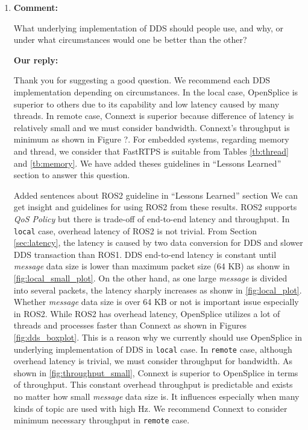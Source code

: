 \documentclass{article}
\begin{document}
\begin{enumerate}
\item \begin{flushleft}
  \textbf{Comment:}
\end{flushleft}
  What underlying implementation of DDS should people use, and why, or under what circumstances would one be better than the other? 

  \begin{flushleft}
    \textbf{Our reply:}
  \end{flushleft}
  Thank you for suggesting a good question.
  We recommend each DDS implementation depending on circumstances.
  In the local case, OpenSplice is superior to others due to its capability and low latency caused by many threads.
  In remote case, Connext is superior because difference of latency is relatively small and we must consider bandwidth.
  Connext's throughput is minimum as shown in Figure ?.
  For embedded systems, regarding memory and thread, we consider that FastRTPS is suitable from Tables \ref{tb:thread} and \ref{tb:memory}.
  We have added theses guidelines in ``Lessons Learned'' section to answer this question.
  \begin{itembox}[|]{Added sentences about ROS2 guideline in ``Lessons Learned'' section}
    We can get insight and guidelines for using ROS2 from these results.
    ROS2 supports \emph{QoS Policy} but there is trade-off of end-to-end latency and throughput.
    In \texttt{local} case, overhead latency of ROS2 is not trivial.
    From Section \ref{sec:latency}, the latency is caused by two data conversion for DDS and slower DDS transaction than ROS1.
    DDS end-to-end latency is constant until \emph{message} data size is lower than maximum packet size (64 KB) as shonw in \ref{fig:local_small_plot}.
    On the other hand, as one large \emph{message} is divided into several packets, the latency sharply increases as shonw in \ref{fig:local_plot}.
    Whether \emph{message} data size is over 64 KB or not is important issue especially in ROS2.
    While ROS2 has overhead latency, OpenSplice utilizes a lot of threads and processes faster than Connext as shown in Figures \ref{fig:dds_boxplot}.
    This is a reason why we currently should use OpenSplice in underlying implementation of DDS in \texttt{local} case.
    In \texttt{remote} case, although overhead latency is trivial, we must consider throughput for bandwidth.
    As shown in \ref{fig:throughput_small}, Connext is superior to OpenSplice in terms of throughput.
    This constant overhead throughput is predictable and exists no matter how small \emph{message} data size is.
    It influences especially when many kinds of topic are used with high Hz.
    We recommend Connext to consider minimum necessary throughput in \texttt{remote} case.
  \end{itembox}\\


\end{enumerate}
\end{document}
